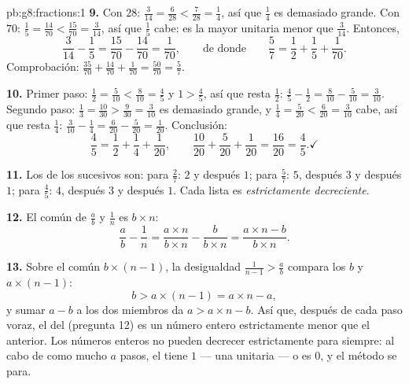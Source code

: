 \begin{solution}{pb:g8:fractions:1}
\textbf{9.} Con  $28$: $\frac{3}{14} = \frac{6}{28} <
\frac{7}{28} = \frac14$, así que $\frac14$ es demasiado grande. Con
 $70$: $\frac15 = \frac{14}{70} < \frac{15}{70} =
\frac{3}{14}$, así que $\frac15$ cabe: es la mayor  unitaria
menor que $\frac{3}{14}$. Entonces,
\[
\frac{3}{14} - \frac15 = \frac{15}{70} - \frac{14}{70}
= \frac{1}{70},
\qquad\text{de donde}\qquad
\frac57 = \frac12 + \frac15 + \frac{1}{70} .
\]
Comprobación: $\frac{35}{70} + \frac{14}{70} + \frac{1}{70} =
\frac{50}{70} = \frac57$.

\textbf{10.} Primer paso: $\frac12 = \frac{5}{10} < \frac{8}{10} =
\frac45$ y $1 > \frac45$, así que resta $\frac12$:
$\frac45 - \frac12 = \frac{8}{10} - \frac{5}{10} = \frac{3}{10}$.
Segundo paso: $\frac13 = \frac{10}{30} > \frac{9}{30} =
\frac{3}{10}$ es demasiado grande, y $\frac14 = \frac{5}{20} <
\frac{6}{20} = \frac{3}{10}$ cabe, así que resta $\frac14$:
$\frac{3}{10} - \frac14 = \frac{6}{20} - \frac{5}{20} =
\frac{1}{20}$. Conclusión:
\[
\frac45 = \frac12 + \frac14 + \frac{1}{20},
\qquad
\frac{10}{20} + \frac{5}{20} + \frac{1}{20} = \frac{16}{20}
= \frac45 . \checkmark
\]

\textbf{11.} Los  de los  sucesivos son:
para $\frac27$: $2$ y después $1$; para $\frac57$: $5$, después $3$ y después
$1$; para $\frac45$: $4$, después $3$ y después $1$. Cada lista es
\emph{estrictamente decreciente}.

\textbf{12.} El  común de $\frac ab$ y $\frac1n$
es $b \times n$:
\[
\frac{a}{b} - \frac{1}{n}
= \frac{a \times n}{b \times n} - \frac{b}{b \times n}
= \frac{a \times n - b}{b \times n} .
\]

\textbf{13.} Sobre el  común $b \times (n-1)$, la
desigualdad $\frac{1}{n-1} > \frac ab$ compara los 
$b$ y $a \times (n - 1)$:
\[
b > a \times (n - 1) = a \times n - a ,
\]
y sumar $a - b$ a los dos miembros da $a > a \times n - b$. Así que,
después de cada paso voraz, el  del  (pregunta
12) es un número entero estrictamente menor que el anterior. Los números
enteros no pueden decrecer estrictamente para siempre: al cabo de como mucho $a$ pasos,
el  tiene  $1$ --- una  unitaria --- o es
$0$, y el método se para.


\end{solution}
